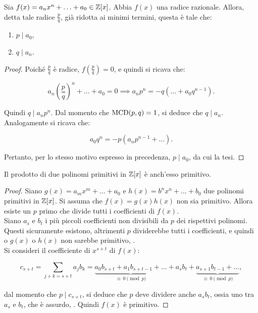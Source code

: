 \documentclass[11pt]{scrbook}
\begin{document}
\begin{theorem}
    \label{th:radici_razionali}
    Sia $f(x) = a_n x^n + \ldots + a_0 \in \mathbb{Z}[x]$. Abbia $f(x)$
    una radice razionale. Allora, detta tale radice $\frac{p}{q}$,  già ridotta ai minimi termini, questa è tale che:

    \begin{enumerate}[ (i.)]
        \item $p \mid a_0$,
        \item $q \mid a_n$.
    \end{enumerate}
\end{theorem}

\begin{proof}
    Poiché $\frac{p}{q}$ è radice, $f\left(\frac{p}{q}\right)=0$, e
    quindi si ricava che:

    \[ a_n \left( \frac{p}{q} \right)^n + \ldots + a_0 = 0 \implies
        a_n p^n = -q( \ldots + a_0 q^{n-1}). \]

    \vskip 0.1in

    Quindi $q \mid a_n p^n$. Dal momento che $\operatorname{MCD}(p, q)=1$, si
    deduce che $q \mid a_n$. \\

    Analogamente si ricava che:

    \[ a_0 q^n = -p(a_n p^{n-1} + \ldots). \]

    \vskip 0.1in

    Pertanto, per lo stesso motivo espresso in precedenza,
    $p \mid a_0$, da cui la tesi.
\end{proof}

\begin{theorem}
    \label{th:lemma_gauss}
    Il prodotto di due polinomi primitivi in $\mathbb{Z}[x]$ è anch'esso primitivo.
\end{theorem}

\begin{proof}
    Siano $g(x) = a_m x^m + \ldots + a_0$ e $h(x) = b^n x^n + \ldots + b_0$ due polinomi primitivi in $\mathbb{Z}[x]$. Si assuma che $f(x)=g(x)h(x)$
    non sia primitivo. Allora esiste un $p$ primo che divide tutti i
    coefficienti di $f(x)$. \\

    Siano $a_s$ e $b_t$ i più piccoli coefficienti non divisibili
    da $p$ dei rispettivi polinomi. Questi sicuramente esistono,
    altrimenti $p$ dividerebbe tutti i coefficienti, e quindi
    o $g(x)$ o $h(x)$ non sarebbe primitivo, \Lightning{}. \\

    Si consideri il coefficiente di $x^{s+t}$ di $f(x)$:

    \[c_{s+t} = \sum_{j+k=s+t} a_j b_k = \underbrace{a_0 b_{s+t} + a_1 b_{s+t-1} + \ldots}_{\equiv \, 0 \pmod p} + a_s b_t + \underbrace{a_{s+1}b_{t-1} + \ldots}_{\equiv \, 0 \pmod p},\]

    dal momento che $p \mid c_{s+t}$, si deduce che $p$ deve dividere
    anche $a_sb_t$, ossia uno tra $a_s$ e $b_t$, che è assurdo, \Lightning{}. Quindi $f(x)$ è primitivo.

\end{proof}
\end{document}
